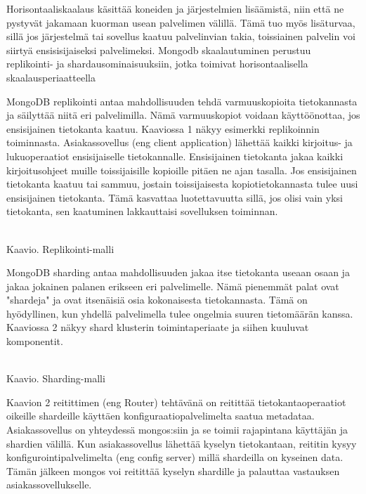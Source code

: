 Horisontaaliskaalaus käsittää koneiden ja järjestelmien lisäämistä, niin että ne pystyvät jakamaan kuorman usean palvelimen välillä.
Tämä tuo myös lisäturvaa, sillä jos järjestelmä tai sovellus kaatuu palvelinvian takia, 
toissiainen palvelin voi siirtyä ensisisijaiseksi palvelimeksi. 
Mongodb skaalautuminen perustuu replikointi- ja shardausominaisuuksiin, jotka toimivat horisontaalisella skaalausperiaatteella 
\medskip




MongoDB replikointi antaa mahdollisuuden tehdä varmuuskopioita tietokannasta ja säilyttää niitä eri palvelimilla.
Nämä varmuuskopiot voidaan käyttöönottaa, jos ensisijainen tietokanta kaatuu. 
Kaaviossa 1 näkyy esimerkki replikoinnin toiminnasta. 
Asiakassovellus (eng client application) lähettää kaikki kirjoitus- ja lukuoperaatiot ensisijaiselle tietokannalle. 
Ensisijainen tietokanta jakaa kaikki kirjoitusohjeet muille toissijaisille kopioille pitäen ne ajan tasalla.
Jos ensisijainen tietokanta kaatuu tai sammuu, jostain toissijaisesta kopiotietokannasta tulee uusi ensisijainen tietokanta.
Tämä kasvattaa luotettavuutta sillä, jos olisi vain yksi tietokanta, sen kaatuminen lakkauttaisi sovelluksen toiminnan. 
\medskip
\bigskip

\\
Kaavio\getChartCount{}. Replikointi-malli 
\medskip



MongoDB sharding antaa mahdollisuuden jakaa itse tietokanta useaan osaan ja jakaa jokainen palanen erikseen eri palvelimelle.
Nämä pienemmät palat ovat "shardeja"{} ja ovat itsenäisiä osia kokonaisesta tietokannasta.
Tämä on hyödyllinen, kun yhdellä palvelimella tulee ongelmia suuren tietomäärän kanssa.
Kaaviossa 2 näkyy shard klusterin toimintaperiaate ja siihen kuuluvat komponentit. 
\medskip



\bigskip
\\
Kaavio\getChartCount{}. Sharding-malli 
\medskip



Kaavion 2 reitittimen (eng Router) tehtävänä on reitittää tietokantaoperaatiot oikeille shardeille käyttäen konfiguraatiopalvelimelta saatua metadataa.
Asiakassovellus on yhteydessä mongos:siin ja se toimii rajapintana käyttäjän ja shardien välillä. 
Kun asiakassovellus lähettää kyselyn tietokantaan, reititin kysyy konfigurointipalvelimelta (eng config server) millä shardeilla on kyseinen data. 
Tämän jälkeen mongos voi reitittää kyselyn shardille ja palauttaa vastauksen asiakassovellukselle.
\medskip

